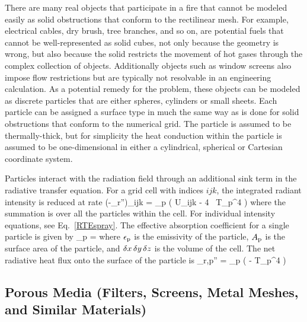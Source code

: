 There are many real objects that participate in a fire that cannot be modeled easily as solid obstructions that conform to the rectilinear mesh. For example, electrical cables, dry brush, tree branches, and so on, are potential fuels that cannot be well-represented as solid cubes, not only because the geometry is wrong, but also because the solid restricts the movement of hot gases through the complex collection of objects.  Additionally objects such as window screens also impose flow restrictions but are typically not resolvable in an engineering calculation. As a potential remedy for the problem, these objects can be modeled as discrete particles that are either spheres, cylinders or small sheets. Each particle can be assigned a surface type in much the same way as is done for solid obstructions that conform to the numerical grid. The particle is assumed to be thermally-thick, but for simplicity the heat conduction within the particle is assumed to be one-dimensional in either a cylindrical, spherical or Cartesian coordinate system.

Particles interact with the radiation field through an additional sink term in the radiative transfer equation. For a grid cell with indices $ijk$, the integrated radiant intensity is reduced at rate
\be \label{eq:qr}
   (-\nabla \cdot \dot{\bq}_{\rm r}'')_{ijk} = \sum \kappa_{\rm p} \left( U_{ijk} - 4 \sigma \, T_{\rm p}^4 \right)
\ee
where the summation is over all the particles within the cell. For individual intensity equations, see Eq.~\ref{RTEspray}. The effective absorption coefficient for a single particle is given by
\be
   \kappa_{\rm p} = 
\ee
where $\epsilon_{\rm p}$ is the emissivity of the particle, $A_{\rm p}$ is the surface area of the particle, and $\delta x \, \delta y \, \delta z$ is the volume of the cell. The net radiative heat flux onto the surface of the particle is
\be
   \dq_{\rm r,p}'' = \epsilon_{\rm p} \left(  - \sigma T_{\rm p}^4 \right)
\ee


\subsection{Porous Media (Filters, Screens, Metal Meshes, and Similar Materials)}

